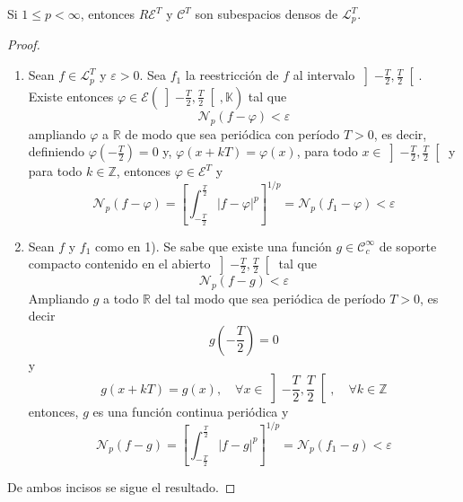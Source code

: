 \documentclass[12pt]{report}
\theoremstyle{largebreak}
\newcommand\abs[1]{\ensuremath{\big|#1\big|}}
\newcommand{\N}[2]{\ensuremath{\mathcal{N}_{#1}\left(#2\right)}}
\begin{document}
    \begin{theor}
        Si $1\leq p<\infty$, entonces $R\mathcal{E}^T$ y $\mathcal{C}^T$ son subespacios densos de $\mathcal{L}_p^T$.
    \end{theor}

    \begin{proof}
        \begin{enumerate}
            \item Sean $f\in\mathcal{L}_p^T$ y $\varepsilon>0$. Sea $f_1$ la reestricción de $f$ al intervalo $\left]-\frac{T}{2},\frac{T}{2} \right[$. Existe entonces $\varphi\in\mathcal{E}(\left]-\frac{T}{2},\frac{T}{2} \right[,\mathbb{K})$ tal que
            \begin{equation*}
                \N{p}{f-\varphi}<\varepsilon
            \end{equation*}
            ampliando $\varphi$ a $\mathbb{R}$ de modo que sea periódica con período $T>0$, es decir, definiendo $\varphi(-\frac{T}{2})=0$ y, $\varphi(x+kT)=\varphi(x)$, para todo $x\in\left]-\frac{T}{2},\frac{T}{2} \right[$ y para todo $k\in\mathbb{Z}$, entonces $\varphi\in\mathcal{E}^T$ y
            \begin{equation*}
                \N{p}{f-\varphi}=\left[\int_{-\frac{T}{2}}^{\frac{T}{2}}\abs{f-\varphi}^p \right]^{1/p}=\N{p}{f_1-\varphi}<\varepsilon
            \end{equation*}
            \item Sean $f$ y $f_1$ como en 1). Se sabe que existe una función $g\in\mathcal{C}_c^\infty$ de soporte compacto contenido en el abierto $\left]-\frac{T}{2},\frac{T}{2} \right[$ tal que
            \begin{equation*}
                \N{p}{f-g}<\varepsilon
            \end{equation*}
            Ampliando $g$ a todo $\mathbb{R}$ del tal modo que sea periódica de período $T>0$, es decir
            \begin{equation*}
                g\left(-\frac{T}{2}\right)=0
            \end{equation*}
            y
            \begin{equation*}
                g(x+kT)=g(x),\quad\forall x\in\left]-\frac{T}{2},\frac{T}{2} \right[,\quad\forall k\in\mathbb{Z}
            \end{equation*}
            entonces, $g$ es una función continua periódica y
            \begin{equation*}
                \N{p}{f-g}=\left[\int_{-\frac{T}{2}}^{\frac{T}{2}}\abs{f-g}^p \right]^{1/p}=\N{p}{f_1-g}<\varepsilon
            \end{equation*}
        \end{enumerate}
        De ambos incisos se sigue el resultado.
    \end{proof}
\end{document}
